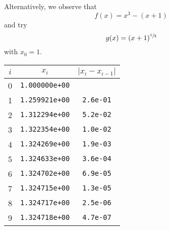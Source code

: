 \begin{example}
    Alternatively, we observe that \[
        f(x) = x^3 - (x + 1)
    \] and try \[
        g(x) = (x + 1)^{\sfrac{1}{3}}
    \] with \( x_0 = 1 \).

    \begin{table}[H]
        \centering
        \begin{tabular}{c|c|c}
            \( i \) & \( x_i \)             & \( | x_i - x_{i-1} | \)
            \\ \hline \hline
            0       & \texttt{1.000000e+00} &
            \\
            1       & \texttt{1.259921e+00} & \texttt{2.6e-01}
            \\
            2       & \texttt{1.312294e+00} & \texttt{5.2e-02}
            \\
            3       & \texttt{1.322354e+00} & \texttt{1.0e-02}
            \\
            4       & \texttt{1.324269e+00} & \texttt{1.9e-03}
            \\
            5       & \texttt{1.324633e+00} & \texttt{3.6e-04}
            \\
            6       & \texttt{1.324702e+00} & \texttt{6.9e-05}
            \\
            7       & \texttt{1.324715e+00} & \texttt{1.3e-05}
            \\
            8       & \texttt{1.324717e+00} & \texttt{2.5e-06}
            \\
            9       & \texttt{1.324718e+00} & \texttt{4.7e-07}
        \end{tabular}
    \end{table}
\end{example}